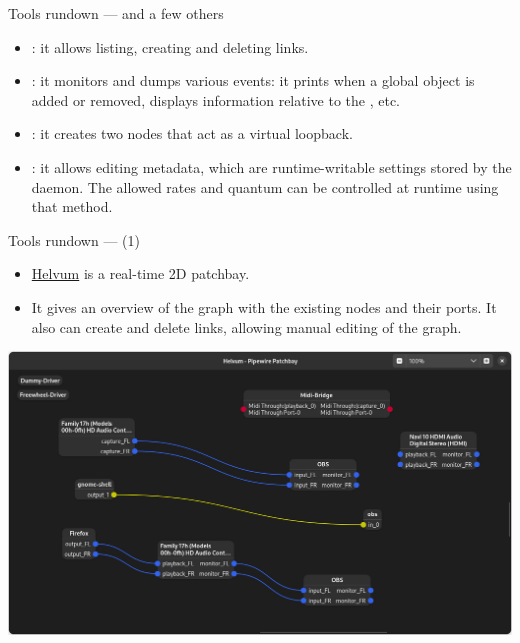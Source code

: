 \begin{frame}{Tools rundown — and a few others}
  \begin{itemize}

  \item {}: it allows listing, creating and deleting links.

  \item {}: it monitors and dumps various events: it prints
    when a global object is added or removed, displays information
    relative to the , etc.

  \item {}: it creates two nodes that act as a virtual
    loopback.

  \item {}: it allows editing metadata, which are
    runtime-writable settings stored by the daemon. The allowed rates
    and quantum can be controlled at runtime using that method.

  \end{itemize}
\end{frame}



\begin{frame}{Tools rundown —  (1)}
  \begin{itemize}

  \item \href{https://gitlab.freedesktop.org/pipewire/helvum}{Helvum}
    is a real-time 2D patchbay.

  \item It gives an overview of the graph with the existing nodes and
    their ports. It also can create and delete links, allowing manual
    editing of the graph.

  \end{itemize}

  \begin{center}
    \includegraphics[height=0.5\textheight]{slides/audio-pipewire/helvum.jpg}
  \end{center}
\end{frame}



